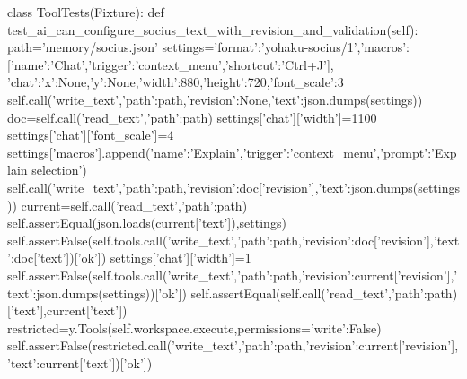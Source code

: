 class ToolTests(Fixture):
    def test_ai_can_configure_socius_text_with_revision_and_validation(self):
        path='memory/socius.json'
        settings={'format':'yohaku-socius/1','macros':[{'name':'Chat','trigger':'context_menu','shortcut':'Ctrl+J'}],
                  'chat':{'x':None,'y':None,'width':880,'height':720,'font_scale':3}}
        self.call('write_text',{'path':path,'revision':None,'text':json.dumps(settings)})
        doc=self.call('read_text',{'path':path})
        settings['chat']['width']=1100
        settings['chat']['font_scale']=4
        settings['macros'].append({'name':'Explain','trigger':'context_menu','prompt':'Explain {selection}'})
        self.call('write_text',{'path':path,'revision':doc['revision'],'text':json.dumps(settings)})
        current=self.call('read_text',{'path':path})
        self.assertEqual(json.loads(current['text']),settings)
        self.assertFalse(self.tools.call('write_text',{'path':path,'revision':doc['revision'],'text':doc['text']})['ok'])
        settings['chat']['width']=1
        self.assertFalse(self.tools.call('write_text',{'path':path,'revision':current['revision'],'text':json.dumps(settings)})['ok'])
        self.assertEqual(self.call('read_text',{'path':path})['text'],current['text'])
        restricted=y.Tools(self.workspace.execute,permissions={'write':False})
        self.assertFalse(restricted.call('write_text',{'path':path,'revision':current['revision'],'text':current['text']})['ok'])

